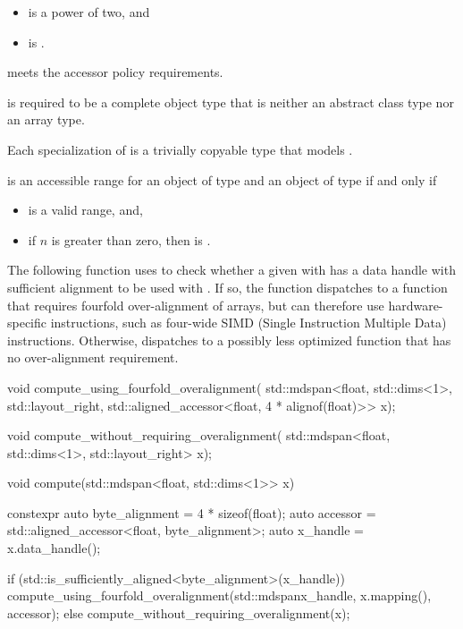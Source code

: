 \pnum
\mandates
\begin{itemize}
\item {} is a power of two, and
\item {} is .
\end{itemize}

\pnum
{} meets the accessor policy requirements.

\pnum
{} is required to be a complete object type
that is neither an abstract class type nor an array type.

\pnum
Each specialization of  is
a trivially copyable type that models .

\pnum
{} is an accessible range
for an object  of type  and
an object of type  if and only if
\begin{itemize}
\item
{} is a valid range, and,
\item
if $n$ is greater than zero,
then  is .
\end{itemize}

\pnum
\begin{example}
The following function 
uses  to check
whether a given  with  has
a data handle with sufficient alignment
to be used with .
If so, the function dispatches to
a function 
that requires fourfold over-alignment of arrays,
but can therefore use hardware-specific instructions,
such as four-wide SIMD (Single Instruction Multiple Data) instructions.
Otherwise,  dispatches to a
possibly less optimized function 
that has no over-alignment requirement.
\begin{codeblock}
void compute_using_fourfold_overalignment(
  std::mdspan<float, std::dims<1>, std::layout_right,
    std::aligned_accessor<float, 4 * alignof(float)>> x);

void compute_without_requiring_overalignment(
  std::mdspan<float, std::dims<1>, std::layout_right> x);

void compute(std::mdspan<float, std::dims<1>> x) {
  constexpr auto byte_alignment = 4 * sizeof(float);
  auto accessor = std::aligned_accessor<float, byte_alignment>{};
  auto x_handle = x.data_handle();

  if (std::is_sufficiently_aligned<byte_alignment>(x_handle)) {
    compute_using_fourfold_overalignment(std::mdspan{x_handle, x.mapping(), accessor});
  } else {
    compute_without_requiring_overalignment(x);
  }
}
\end{codeblock}
\end{example}

